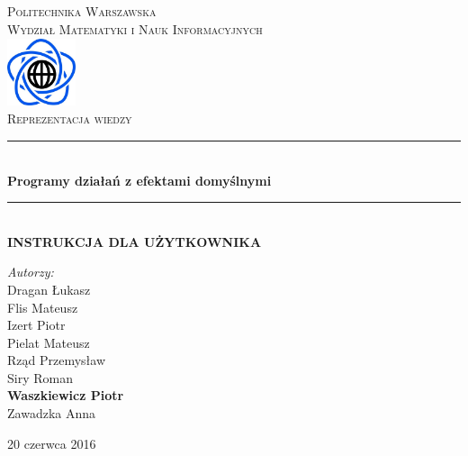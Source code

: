 \documentclass{article}
\begin{document}
	
\begin{titlepage}

\newcommand{\HRule}{\rule{\linewidth}{0.5mm}}

\begin{center}

\textsc{\LARGE Politechnika Warszawska}\\[0.5cm]
\textsc{\Large Wydział Matematyki i Nauk Informacyjnych}\\[1cm]

\includegraphics[width=2cm, height=2cm]{logo}\\[1cm]


\textsc{\Huge Reprezentacja wiedzy}\\[0.4cm]


\HRule \\[0.4cm]
{ \LARGE \bfseries Programy działań z efektami domyślnymi}\\[0.2cm]
 

\HRule \\[0.4cm]
{  \bfseries INSTRUKCJA DLA UŻYTKOWNIKA}\\[1.5cm]

\begin{flushright}
\Large \emph{Autorzy:}\\[0.5cm]
Dragan Łukasz\\
Flis Mateusz\\
Izert Piotr\\
Pielat Mateusz\\
Rząd Przemysław\\
Siry Roman\\
\textbf{Waszkiewicz Piotr}\\
Zawadzka Anna\\[0.9cm]

\end{flushright}

\vfill
{\large 20 czerwca 2016}\\[1cm]
	
\end{center}

\end{titlepage}
\end{document}
